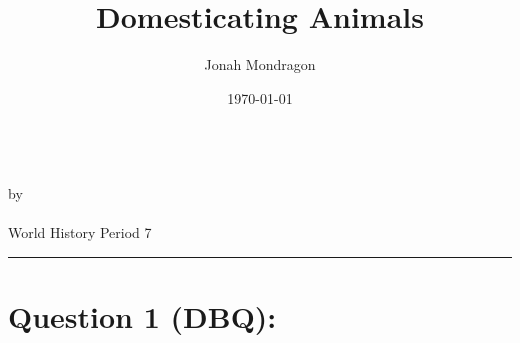 \documentclass[12pt]{article}
\newcommand{\PutTitle}[1]
{
    \begin{center}
        {\huge\bfseries\thetitle}\\
        by \theauthor\\
        \thedate\\
        #1        
    \end{center}
    \hrule
    \vspace{2ex}
}
\begin{document}
\title{Domesticating Animals}
\author{Jonah Mondragon}
\date{\today}
\PutTitle{World History Period 7}

\doublespacing

\section*{Question 1 (DBQ):}
\end{document}
